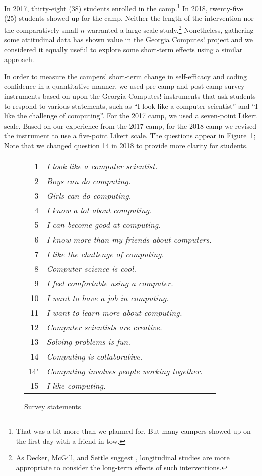 In 2017, thirty-eight (38) students enrolled in the camp.\footnote{That
was a bit more than we planned for.  But many campers showed up on the
first day with a friend in tow.}  In 2018, twenty-five (25) students
showed up for the camp.  Neither the length of the intervention
nor the comparatively small $n$ warranted a large-scale study.\footnote{
As Decker, McGill, and Settle suggest \cite{Decker2016,McGill2015},
longitudinal studies are more appropriate to consider the long-term
effects of such interventions.}  Nonetheless, gathering some attitudinal
data has shown value in the Georgia Computes! project \cite{Bruckman2009}
and we considered it equally useful to explore some short-term effects
using a similar approach.

In order to measure the campers' short-term change in self-efficacy
and coding confidence in a quantitative manner, we used pre-camp
and post-camp survey instruments based on upon the Georgia Computes!
instruments \cite{Bruckman2009} that ask students to respond to
various statements, such as ``I look like a computer scientist''
and ``I like the challenge of computing''.  For the 2017 camp, we
used  a seven-point Likert scale.  Based on our experience from the
2017 camp, for the 2018 camp we revised the instrument to use a
five-point Likert scale.  The questions appear in Figure~1; Note
that we changed question 14 in 2018 to provide more clarity for
students.

\begin{figure}
{\small
\begin{tabular}{r|l}
 1 & \textit{I look like a computer scientist.} \\
 2 & \textit{Boys can do computing.} \\
 3 & \textit{Girls can do computing.} \\
 4 & \textit{I know a lot about computing.} \\
 5 & \textit{I can become good at computing.} \\
 6 & \textit{I know more than my friends about computers.} \\
 7 & \textit{I like the challenge of computing.} \\
 8 & \textit{Computer science is cool.} \\
 9 & \textit{I feel comfortable using a computer.} \\
10 & \textit{I want to have a job in computing.} \\
11 & \textit{I want to learn more about computing.} \\
12 & \textit{Computer scientists are creative.} \\
13 & \textit{Solving problems is fun.} \\
14 & \textit{Computing is collaborative.} \\
14' & \textit{Computing involves people working together.} \\
15 & \textit{I like computing.} 
\end{tabular}
}
\caption{Survey statements}
\end{figure}

